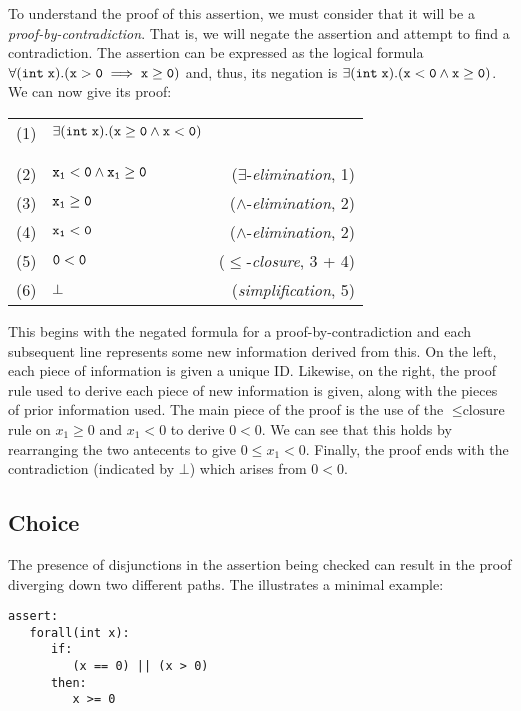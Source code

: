 To understand the proof of this assertion, we must consider that it
will be a {\em proof-by-contradiction}.  That is, we will negate the
assertion and attempt to find a contradiction.  The assertion can be
expressed as the logical formula
${\tt \forall(int\;x).(x>0\implies x\ge 0)}$ and, thus, its negation
is ${\tt\exists(int\;x).(x < 0\land x\ge 0)}$.  We can now give its
proof:

\begin{tcolorbox}
\begin{tabularx}{\textwidth}{l X r}
(1) & ${\tt \exists(int\;x).(x\ge 0\land x < 0)}$ &\\
&&\\
\hline
\hline
&&\\
(2) & ${\tt x_1 < 0 \land x_1\ge 0}$ & ($\exists$-{\em elimination}, 1)\\
(3) & ${\tt x_1 \ge 0}$ & ($\land$-{\em elimination}, 2)\\
(4) & ${\tt x_1 < 0}$ & ($\land$-{\em elimination}, 2)\\
(5) & ${\tt 0 < 0}$ & ($\le$-{\em closure}, 3 + 4)\\
(6) & ${\tt \bot}$ & ({\em simplification}, 5)\\
\end{tabularx}
\end{tcolorbox}

This begins with the negated formula for a proof-by-contradiction and
each subsequent line represents some new information derived from
this.  On the left, each piece of information is given a unique ID.
Likewise, on the right, the proof rule used to derive each piece of
new information is given, along with the pieces of prior information
used.  The main piece of the proof is the use of the
$\le\!\textrm{closure}$ rule on $x_1\ge 0$ and $x_1 < 0$ to derive
$0 < 0$.  We can see that this holds by rearranging the two antecents
to give $0 \le x_1 < 0$.  Finally, the proof ends with the
contradiction (indicated by $\bot$) which arises from $0 < 0$.

\subsection{Choice}

The presence of disjunctions in the assertion being checked can result
in the proof diverging down two different paths.  The illustrates a
minimal example:

\begin{tcolorbox}\begin{lstlisting}[language=WyAL]
assert:
   forall(int x):
      if:
         (x == 0) || (x > 0)
      then:
         x >= 0
\end{lstlisting}\end{tcolorbox}

